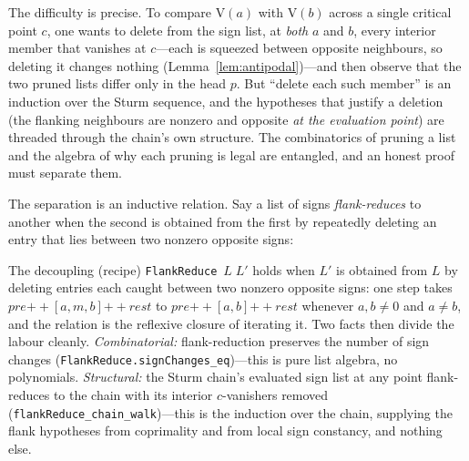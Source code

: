 \documentclass[11pt]{article}
\newcommand{\lean}[1]{\texttt{#1}}
\newcommand{\V}{\mathrm{V}}
\begin{document}
The difficulty is precise. To compare $\V(a)$ with $\V(b)$ across a single critical point $c$, one
wants to delete from the sign list, at \emph{both} $a$ and $b$, every interior member that vanishes
at $c$---each is squeezed between opposite neighbours, so deleting it changes nothing
(Lemma~\ref{lem:antipodal})---and then observe that the two pruned lists differ only in the head
$p$. But ``delete each such member'' is an induction over the Sturm sequence, and the hypotheses
that justify a deletion (the flanking neighbours are nonzero and opposite \emph{at the evaluation
point}) are threaded through the chain's own structure. The combinatorics of pruning a list and the
algebra of why each pruning is legal are entangled, and an honest proof must separate them.

The separation is an inductive relation. Say a list of signs \emph{flank-reduces} to another when
the second is obtained from the first by repeatedly deleting an entry that lies between two nonzero
opposite signs:
\begin{recipebox}{The decoupling (recipe)}
\lean{FlankReduce}~$L\;L'$ holds when $L'$ is obtained from $L$ by deleting entries each caught
between two nonzero opposite signs: one step takes
$\textit{pre}\mathbin{+\!\!+}[a,m,b]\mathbin{+\!\!+}\textit{rest}$ to
$\textit{pre}\mathbin{+\!\!+}[a,b]\mathbin{+\!\!+}\textit{rest}$ whenever $a,b\ne0$ and $a\ne b$, and
the relation is the reflexive closure of iterating it. Two facts then divide the labour cleanly. \emph{Combinatorial:} flank-reduction preserves the
number of sign changes (\lean{FlankReduce.signChanges\_eq})---this is pure list algebra, no
polynomials. \emph{Structural:} the Sturm chain's evaluated sign list at any point flank-reduces to
the chain with its interior $c$-vanishers removed (\lean{flankReduce\_chain\_walk})---this is the
induction over the chain, supplying the flank hypotheses from coprimality and from local sign
constancy, and nothing else.
\end{recipebox}
\end{document}
